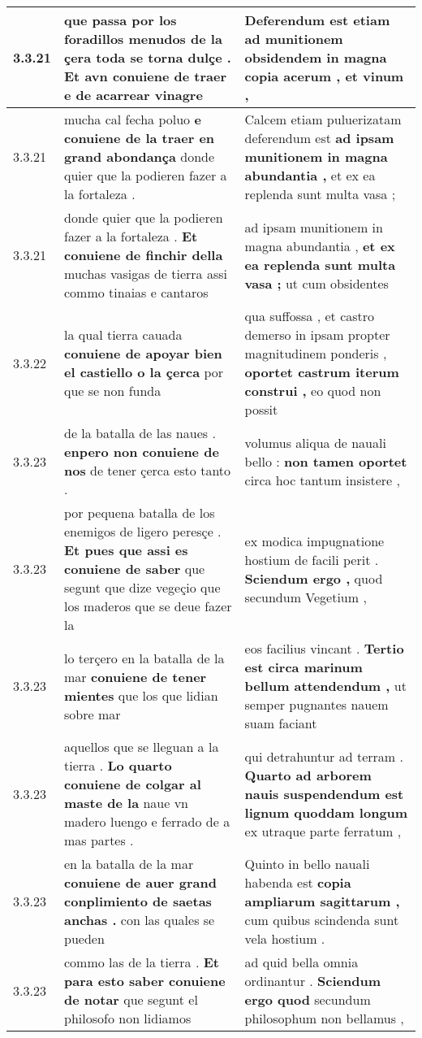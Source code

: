 \begin{tabular}{|p{1cm}|p{6.5cm}|p{6.5cm}|}
3.3.21 & que passa por los foradillos menudos de la çera toda se torna dulçe . \textbf{ Et avn conuiene de traer } e de acarrear vinagre & Deferendum est etiam ad munitionem obsidendem \textbf{ in magna copia acerum , } et vinum , \\\hline
3.3.21 & mucha cal fecha poluo \textbf{ e conuiene de la traer en grand abondança } donde quier que la podieren fazer a la fortaleza . & Calcem etiam puluerizatam deferendum est \textbf{ ad ipsam munitionem in magna abundantia , } et ex ea replenda sunt multa vasa ; \\\hline
3.3.21 & donde quier que la podieren fazer a la fortaleza . \textbf{ Et conuiene de finchir della } muchas vasigas de tierra assi commo tinaias e cantaros & ad ipsam munitionem in magna abundantia , \textbf{ et ex ea replenda sunt multa vasa ; } ut cum obsidentes \\\hline
3.3.22 & la qual tierra cauada \textbf{ conuiene de apoyar bien el castiello o la çerca } por que se non funda & qua suffossa , et castro demerso in ipsam propter magnitudinem ponderis , \textbf{ oportet castrum iterum construi , } eo quod non possit \\\hline
3.3.23 & de la batalla de las naues . \textbf{ enpero non conuiene de nos } de tener çerca esto tanto . & volumus aliqua de nauali bello : \textbf{ non tamen oportet } circa hoc tantum insistere , \\\hline
3.3.23 & por pequena batalla de los enemigos de ligero peresçe . \textbf{ Et pues que assi es conuiene de saber } que segunt que dize vegeçio que los maderos que se deue fazer la & ex modica impugnatione hostium de facili perit . \textbf{ Sciendum ergo , } quod secundum Vegetium , \\\hline
3.3.23 & lo terçero en la batalla de la mar \textbf{ conuiene de tener mientes } que los que lidian sobre mar & eos facilius vincant . \textbf{ Tertio est circa marinum bellum attendendum , } ut semper pugnantes nauem suam faciant \\\hline
3.3.23 & aquellos que se lleguan a la tierra . \textbf{ Lo quarto conuiene de colgar al maste de la } naue vn madero luengo e ferrado de a mas partes . & qui detrahuntur ad terram . \textbf{ Quarto ad arborem nauis suspendendum est lignum quoddam longum } ex utraque parte ferratum , \\\hline
3.3.23 & en la batalla de la mar \textbf{ conuiene de auer grand conplimiento de saetas anchas . } con las quales se pueden & Quinto in bello nauali habenda est \textbf{ copia ampliarum sagittarum , } cum quibus scindenda sunt vela hostium . \\\hline
3.3.23 & commo las de la tierra . \textbf{ Et para esto saber conuiene de notar } que segunt el philosofo non lidiamos & ad quid bella omnia ordinantur . \textbf{ Sciendum ergo quod } secundum philosophum non bellamus , \\\hline

\end{tabular}
